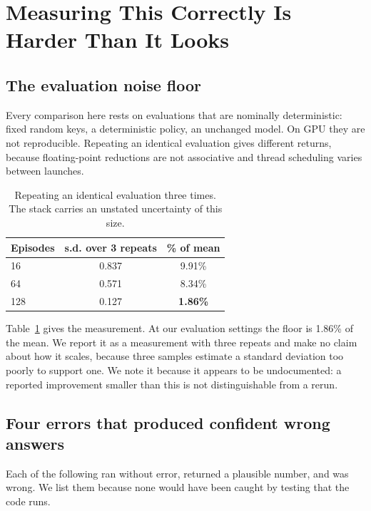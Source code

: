 \documentclass[conference]{IEEEtran}
\newcommand{\tabfont}{\footnotesize}
\begin{document}
\section{Measuring This Correctly Is Harder Than It Looks}
\label{sec:pitfalls}

\subsection{The evaluation noise floor}

Every comparison here rests on evaluations that are nominally
deterministic: fixed random keys, a deterministic policy, an unchanged
model. On GPU they are not reproducible. Repeating an identical
evaluation gives different returns, because floating-point reductions are
not associative and thread scheduling varies between launches.

\begin{table}[t]
\caption{Repeating an identical evaluation three times. The stack carries
an unstated uncertainty of this size.}
\label{tab:noisefloor}
\centering
\tabfont
\begin{tabular}{@{}lcc@{}}
\toprule
\textbf{Episodes} & \textbf{s.d. over 3 repeats} & \textbf{\% of mean} \\
\midrule
16  & 0.837 & 9.91\% \\
64  & 0.571 & 8.34\% \\
128 & 0.127 & \textbf{1.86\%} \\
\bottomrule
\end{tabular}
\end{table}

Table~\ref{tab:noisefloor} gives the measurement. At our evaluation
settings the floor is 1.86\% of the mean. We report it as a measurement
with three repeats and make no claim about how it scales, because three
samples estimate a standard deviation too poorly to support one. We note
it because it appears to be undocumented: a reported improvement smaller
than this is not distinguishable from a rerun.

\subsection{Four errors that produced confident wrong answers}

Each of the following ran without error, returned a plausible number, and
was wrong. We list them because none would have been caught by testing
that the code runs.
\end{document}
